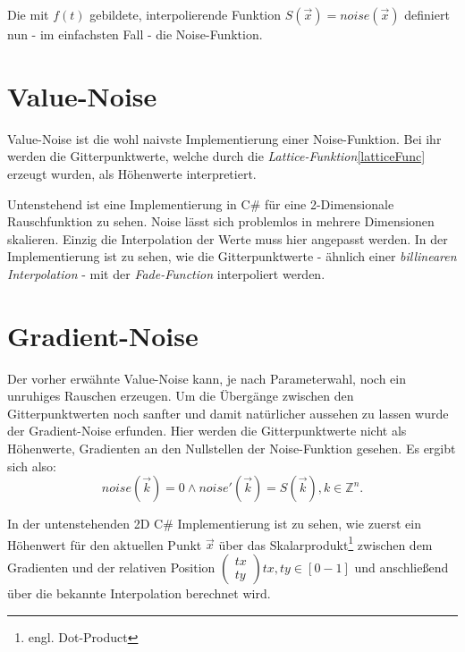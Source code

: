 Die mit $f(t)$ gebildete, interpolierende Funktion $S(\vec{x}) = noise(\vec{x})$ definiert nun - im einfachsten Fall - die Noise-Funktion.


\section{Value-Noise}\label{Value-Noise}
Value-Noise ist die wohl naivste Implementierung einer Noise-Funktion. Bei ihr werden die Gitterpunktwerte, welche durch die \emph{Lattice-Funktion}\ref{latticeFunc} erzeugt wurden, als Höhenwerte interpretiert.

Untenstehend ist eine Implementierung in C\# für eine 2-Dimensionale Rauschfunktion zu sehen.
Noise lässt sich problemlos in mehrere Dimensionen skalieren. Einzig die Interpolation der Werte muss hier angepasst werden. In der Implementierung ist zu sehen, wie die Gitterpunktwerte - ähnlich einer \emph{billinearen Interpolation} - mit der \emph{Fade-Function} interpoliert werden.

\label{valueNoise.cs}

\section{Gradient-Noise}\label{Gradient-Noise}
Der vorher erwähnte Value-Noise kann, je nach Parameterwahl, noch ein unruhiges Rauschen erzeugen. Um die Übergänge zwischen den Gitterpunktwerten noch sanfter und damit natürlicher aussehen zu lassen wurde der Gradient-Noise erfunden.
Hier werden die Gitterpunktwerte nicht als Höhenwerte, Gradienten an den Nullstellen der Noise-Funktion gesehen.
Es ergibt sich also:
\begin{equation}
noise(\vec{k}) = 0 \land 
noise'(\vec{k}) = S(\vec{k}),  k \in \mathbb{Z}^n  .
\end{equation}

In der untenstehenden 2D C\# Implementierung ist zu sehen, wie zuerst ein Höhenwert für den aktuellen Punkt  $\vec{x}$ über das Skalarprodukt\footnote{engl. Dot-Product} zwischen dem Gradienten und der relativen Position $\begin{pmatrix}tx\\ty\end{pmatrix}  tx, ty\in [0-1]$ und anschließend über die bekannte Interpolation berechnet wird.


 

